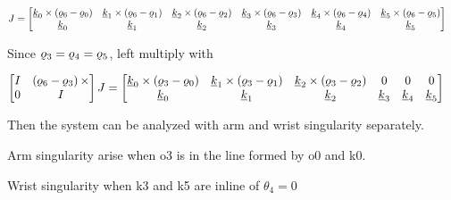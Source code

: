 \begin{solutionbox}[Q2-2]
    \footnotesize
    \begin{align*}
        J & =
        \begin{bmatrix}
            \pv{k}_0\times \left(\ppori{6}-\ppori{0}\right) &
            \pv{k}_1\times \left(\ppori{6}-\ppori{1}\right) &
            \pv{k}_2\times \left(\ppori{6}-\ppori{2}\right) &
            \pv{k}_3\times \left(\ppori{6}-\ppori{3}\right) &
            \pv{k}_4\times \left(\ppori{6}-\ppori{4}\right) &
            \pv{k}_5\times \left(\ppori{6}-\ppori{5}\right)   \\
            \pv{k}_0                                        &
            \pv{k}_1                                        &
            \pv{k}_2                                        &
            \pv{k}_3                                        &
            \pv{k}_4                                        &
            \pv{k}_5
        \end{bmatrix}
    \end{align*}
    \normalsize

    Since $\ppori{3} = \ppori{4}=\ppori{5}$, left multiply with $$$$

    \begin{align*}
        \begin{bmatrix}
            I & \left(\ppori{6}-\ppori{3}\right)\times \\
            0 & I
        \end{bmatrix} J & =
        \begin{bmatrix}
            \pv{k}_0\times \left(\ppori{3}-\ppori{0}\right) &
            \pv{k}_1\times \left(\ppori{3}-\ppori{1}\right) &
            \pv{k}_2\times \left(\ppori{3}-\ppori{2}\right) & 0 & 0 & 0 \\
            \pv{k}_0                                        &
            \pv{k}_1                                        &
            \pv{k}_2                                        &
            \pv{k}_3                                        &
            \pv{k}_4                                        &
            \pv{k}_5
        \end{bmatrix}
    \end{align*}

    Then the system can be analyzed with arm and wrist singularity separately.

    Arm singularity arise when o3 is in the line formed by o0 and k0.

    Wrist singularity when k3 and k5 are inline of $\theta_4=0$

\end{solutionbox}


